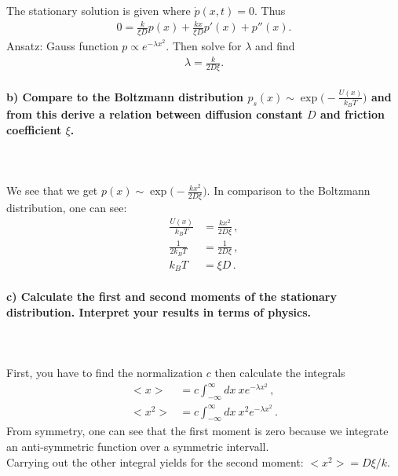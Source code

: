     The stationary solution is given where $\dot{p}(x,t) = 0$. Thus
    \begin{align}
    	0 = \frac{k}{\xi D} p(x) + \frac{kx}{\xi D} p'(x) + p''(x).
    \end{align}
    Ansatz: Gauss function $p \propto e^{-\lambda x^2}$. Then solve for $\lambda$ and find
	\begin{align}
	\lambda = \frac{k}{2D\xi}.
	\end{align}

\newpage
\paragraph{b) Compare to the Boltzmann distribution 
    $p_s(x)\sim\exp\bigg(-\frac{U(x)}{k_BT}\bigg)$ and from this derive a 
    relation between diffusion constant $D$ and friction coefficient $\xi$.
} \ \\
\\
    We see that we get $p(x)\sim\exp\bigg(-\frac{k x^2}{2D\xi}\bigg)$. In comparison to the Boltzmann
    distribution, one can see:
    \begin{align}
    \frac{U(x)}{k_BT} &= \frac{k x^2}{2D\xi} \,, \\
    \frac{1}{2k_BT} &= \frac{1}{2D\xi} \,, \\
    k_BT &= \xi D \,.
    \end{align}

\paragraph{c) Calculate the first and second moments of the stationary
    distribution. Interpret your results in terms of physics.
} \ \\
\\
    First, you have to find the normalization $c$ then calculate the integrals
    \begin{align}
    <x> &= c \int_{-\infty}^{\infty} dx \ x e^{-\lambda x^2} \,, \\
    <x^2> &= c \int_{-\infty}^{\infty} dx \ x^2 e^{-\lambda x^2} \,.
    \end{align}
	From symmetry, one can see that the first moment is zero because we integrate an anti-symmetric function over a symmetric intervall. \\
	Carrying out the other integral yields for the second moment: $<x^2> = D\xi / k$.